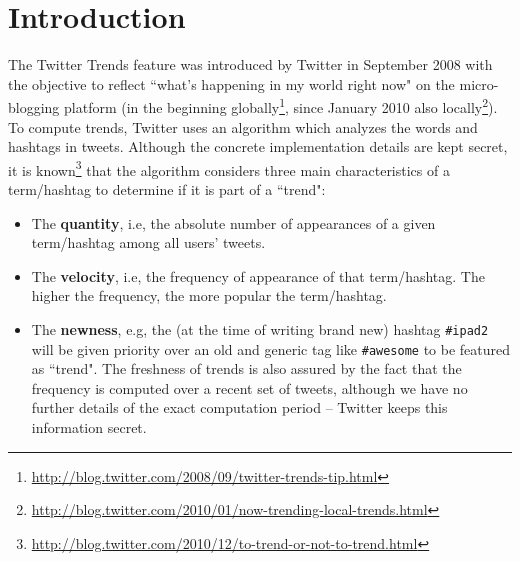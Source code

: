 \documentclass[runningheads,a4paper]{llncs}
\begin{document}
\section{Introduction}\label{sec:introduction}
The Twitter Trends feature was introduced by Twitter in September 2008 with the objective to reflect ``what's happening in my world right now" on the micro-blogging platform (in the beginning globally\footnote{\url{http://blog.twitter.com/2008/09/twitter-trends-tip.html}}, since January 2010 also locally\footnote{\url{http://blog.twitter.com/2010/01/now-trending-local-trends.html}}).
To compute trends, Twitter uses an algorithm which analyzes the words and hashtags in tweets. Although the concrete implementation details are kept secret, it is known\footnote{\url{http://blog.twitter.com/2010/12/to-trend-or-not-to-trend.html}} that the algorithm considers three main characteristics of a term/hashtag to determine if it is part of a ``trend":

\begin{itemize}
\item The \textbf{quantity}, i.e, the absolute number of appearances of a given term/hashtag among all users' tweets.
\item The \textbf{velocity}, i.e, the frequency of appearance of that term/hashtag. The higher the frequency, the more popular the term/hashtag.
\item The \textbf{newness}, e.g, the (at the time of writing brand new) hashtag \texttt{\#ipad2} will be given priority over an old and generic tag like \texttt{\#awesome} to be featured as ``trend". The freshness of trends is also assured by the fact that the frequency is computed over a recent set of tweets, although we have no further details of the exact computation period -- Twitter keeps this information secret.
\end{itemize}

\end{document}
